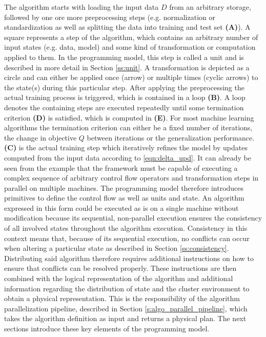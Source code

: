 The algorithm starts with loading the input data $D$ from an arbitrary storage, followed by one ore more preprocessing steps (e.g. normalization or standardization as well as splitting the data into training and test set \textbf{(A)}).
A square represents a step of the algorithm, which contains an arbitrary number of input states (e.g. data, model) and some kind of transformation or computation applied to them.
In the programming model, this step is called a unit and is described in more detail in Section \ref{ss:unit}.
A transformation is depicted as a circle and can either be applied once (arrow) or multiple times (cyclic arrows) to the state(s) during this particular step.
After applying the preprocessing the actual training process is triggered, which is contained in a loop \textbf{(B)}.
A loop denotes the containing steps are executed repeatedly until some termination criterion \textbf{(D)} is satisfied, which is computed in \textbf{(E)}.
For most machine learning algorithms the termination criterion can either be a fixed number of iterations, the change in objective $Q$ between iterations or the generalization performance.
\textbf{(C)} is the actual training step which iteratively refines the model by updates computed from the input data according to \ref{eqn:delta_upd}.
It can already be seen from the example that the framework must be capable of executing a complex sequence of arbitrary control flow operators and transformation steps in parallel on multiple machines.
The programming model therefore introduces primitives to define the control flow as well as units and state.
An algorithm expressed in this form could be executed as is on a single machine without modification because its sequential, non-parallel execution ensures the consistency of all involved states throughout the algorithm execution.
Consistency in this context means that, because of its sequential execution, no conflicts can occur when altering a particular state as described in Section \ref{ss:consistency}.
Distributing said algorithm therefore requires additional instructions on how to ensure that conflicts can be resolved properly.
These instructions are then combined with the logical representation of the algorithm and additional information regarding the distribution of state and the cluster environment to obtain a physical representation.
This is the responsibility of the algorithm parallelization pipeline, described in Section \ref{s:algo_parallel_pipeline}, which takes the algorithm definition as input and returns a physical plan.
The next sections introduce these key elements of the programming model.

